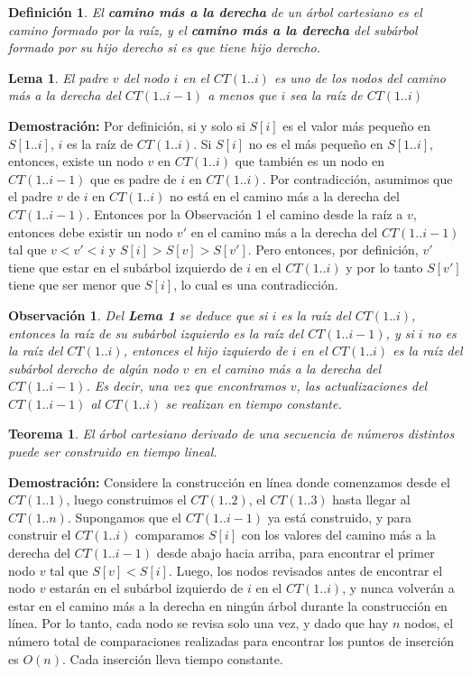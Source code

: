 \documentclass[12pt]{article}
\newcommand{\proof}{\textbf{Demostración:} }
\newcommand{\ct}{árbol cartesiano }
\newcommand{\rmp}{camino más a la derecha }
\newtheorem{theorem}{Teorema}
\newtheorem{lemma}{Lema}
\newtheorem{definition}{Definición}
\newtheorem{observation}{Observación}
\begin{document}
\begin{definition}
	El \textbf{\rmp}de un \ct es el camino formado por la raíz, y el \textbf{\rmp}del subárbol formado por su hijo derecho si es que tiene hijo derecho.
\end{definition}

\begin{lemma}
	El padre $v$ del nodo $i$ en el $CT(1..i)$ es uno de los nodos del \rmp del $CT(1..i-1)$ a menos que $i$ sea la raíz de $CT(1..i)$
\end{lemma}

\proof Por definición, si y solo si $S[i]$ es el valor más pequeño en $S[1..i]$, $i$ es la raíz de $CT(1..i)$. Si $S[i]$ no es el más pequeño en $S[1..i]$, entonces, existe un nodo $v$ en $CT(1..i)$ que también es un nodo en $CT(1..i-1)$ que es padre de $i$ en $CT(1..i)$. Por contradicción, asumimos que el padre $v$ de $i$ en $CT(1..i)$ no está en el \rmp del $CT(1..i-1)$. Entonces por la Observación 1 el camino desde la raíz a $v$, entonces debe existir un nodo $v'$ en el \rmp del $CT(1..i-1)$ tal que $v < v' < i$ y $S[i] > S[v] > S[v']$. Pero entonces, por definición, $v'$ tiene que estar en el subárbol izquierdo de $i$ en el $CT(1..i)$ y por lo tanto $S[v']$ tiene que ser menor que $S[i]$, lo cual es una contradicción.

\begin{observation}
	Del \textbf{Lema 1} se deduce que si $i$ es la raíz del $CT(1..i)$, entonces la raíz de su subárbol izquierdo es la raíz del $CT(1..i-1)$, y si $i$ no es la raíz del $CT(1..i)$, entonces el hijo izquierdo de $i$ en el $CT(1..i)$ es la raíz del subárbol derecho de algún nodo $v$ en el \rmp del $CT(1..i-1)$. Es decir, una vez que encontramos $v$, las actualizaciones del $CT(1..i-1)$ al $CT(1..i)$ se realizan en tiempo constante.
\end{observation}

\begin{theorem}
	El \ct derivado de una secuencia de números distintos puede ser construido en tiempo lineal.
\end{theorem}

\proof Considere la construcción en línea donde comenzamos desde el $CT(1..1)$, luego construimos el $CT(1..2)$, el $CT(1..3)$ hasta llegar al $CT(1..n)$. Supongamos que el $CT(1..i-1)$ ya está construido, y para construir el $CT(1..i)$ comparamos $S[i]$ con los valores del camino más a la derecha del $CT(1..i-1)$ desde abajo hacia arriba, para encontrar el primer nodo $v$ tal que $S[v] < S[i]$. Luego, los nodos revisados antes de encontrar el nodo $v$ estarán en el subárbol izquierdo de $i$ en el $CT(1..i)$, y nunca volverán a estar en el camino más a la derecha en ningún árbol durante la construcción en línea. Por lo tanto, cada nodo se revisa solo una vez, y dado que hay $n$ nodos, el número total de comparaciones realizadas para encontrar los puntos de inserción es $O(n)$. Cada inserción lleva tiempo constante.
\end{document}
